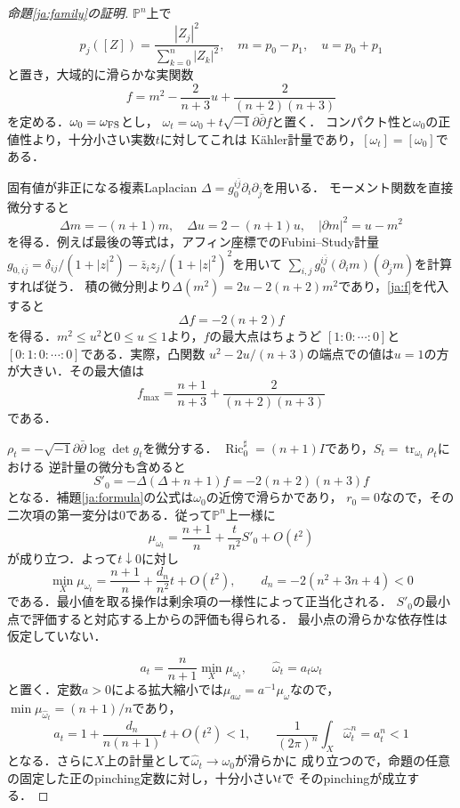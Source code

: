 \documentclass[12pt]{amsart}
\theoremstyle{definition}
\theoremstyle{remark}
\numberwithin{equation}{section}
\DeclareMathOperator{\Ric}{Ric}
\DeclareMathOperator{\tr}{tr}
\theoremstyle{plain}
\theoremstyle{remark}
\theoremstyle{definition}
\begin{document}
\begin{proof}[命題\ref{ja:family}の証明]
$\mathbb P^n$上で
\[
 p_j([Z])=\frac{|Z_j|^2}{\sum_{k=0}^n|Z_k|^2},\quad
 m=p_0-p_1,\quad u=p_0+p_1
\]
と置き，大域的に滑らかな実関数
\begin{equation}\label{ja:f}
 f=m^2-\frac2{n+3}u+\frac2{(n+2)(n+3)}
\end{equation}
を定める．$\omega_0=\omega_{\rm FS}$とし，
$\omega_t=\omega_0+t\sqrt{-1}\partial\bar\partial f$と置く．
コンパクト性と$\omega_0$の正値性より，十分小さい実数$t$に対してこれは
K\"ahler計量であり，$[\omega_t]=[\omega_0]$である．

固有値が非正になる複素Laplacian
$\Delta=g_0^{i\bar j}\partial_i\partial_{\bar j}$を用いる．
モーメント関数を直接微分すると
\[
 \Delta m=-(n+1)m,\quad \Delta u=2-(n+1)u,
 \quad |\partial m|^2=u-m^2
\]
を得る．例えば最後の等式は，アフィン座標でのFubini--Study計量
$g_{0,i\bar j}=\delta_{ij}/(1+|z|^2)-\bar z_i z_j/(1+|z|^2)^2$を用いて
$\sum_{i,j}g_0^{i\bar j}(\partial_i m)(\partial_{\bar j}m)$を計算すれば従う．
積の微分則より$\Delta(m^2)=2u-2(n+2)m^2$であり，\eqref{ja:f}を代入すると
\begin{equation}\label{ja:eigenfunction}
 \Delta f=-2(n+2)f
\end{equation}
を得る．$m^2\leq u^2$と$0\leq u\leq1$より，$f$の最大点はちょうど
$[1:0:\cdots:0]$と$[0:1:0:\cdots:0]$である．実際，凸関数
$u^2-2u/(n+3)$の端点での値は$u=1$の方が大きい．その最大値は
\[
 f_{\max}=\frac{n+1}{n+3}+\frac2{(n+2)(n+3)}
\]
である．

$\rho_t=-\sqrt{-1}\partial\bar\partial\log\det g_t$を微分する．
$\Ric^\sharp_0=(n+1)I$であり，$S_t=\tr_{\omega_t}\rho_t$における
逆計量の微分も含めると
\begin{equation}\label{ja:variation}
 S'_0=-\Delta(\Delta+n+1)f
     =-2(n+2)(n+3)f
\end{equation}
となる．補題\ref{ja:formula}の公式は$\omega_0$の近傍で滑らかであり，
$r_0=0$なので，その二次項の第一変分は0である．従って$\mathbb P^n$上一様に
\begin{equation}\label{ja:muvariation}
 \mu_{\omega_t}=\frac{n+1}{n}+\frac{t}{n^2}S'_0+O(t^2)
\end{equation}
が成り立つ．よって$t\downarrow0$に対し
\[
 \min_X\mu_{\omega_t}=\frac{n+1}{n}+\frac{d_n}{n^2}t+O(t^2),
 \qquad d_n=-2(n^2+3n+4)<0
\]
である．最小値を取る操作は剰余項の一様性によって正当化される．
$S'_0$の最小点で評価すると対応する上からの評価も得られる．
最小点の滑らかな依存性は仮定していない．

\begin{equation}\label{ja:scale}
 a_t=\frac n{n+1}\min_X\mu_{\omega_t},\qquad
 \widehat\omega_t=a_t\omega_t
\end{equation}
と置く．定数$a>0$による拡大縮小では$\mu_{a\omega}=a^{-1}\mu_\omega$なので，
$\min\mu_{\widehat\omega_t}=(n+1)/n$であり，
\[
 a_t=1+\frac{d_n}{n(n+1)}t+O(t^2)<1,
 \qquad \frac1{(2\pi)^n}\int_X\widehat\omega_t^n=a_t^n<1
\]
となる．さらに$X$上の計量として$\widehat\omega_t\to\omega_0$が滑らかに
成り立つので，命題の任意の固定した正のpinching定数に対し，十分小さい$t$で
そのpinchingが成立する．


\end{proof}
\end{document}
